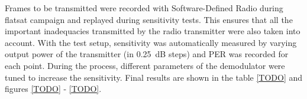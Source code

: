 Frames to be transmitted were recorded with Software-Defined Radio during flatsat campaign and replayed during sensitivity tests. This ensures that all the important inadequacies transmitted by the radio transmitter were also taken into account.
With the test setup, sensitivity was automatically measured by varying output power of the transmitter (in \SI{0.25}{\dB} steps) and PER was recorded for each point. During the process, different parameters of the demodulator were tuned to increase the sensitivity. Final results are shown in the table \ref{TODO} and figures \ref{TODO} - \ref{TODO}.
